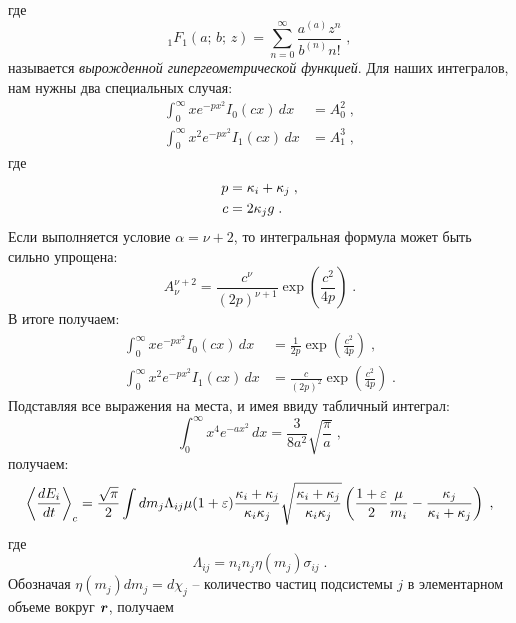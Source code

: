где 
\begin{equation}
  \mbox{}_{1}F_{1}(a;\,b;\,z) = \sum_{n=0}^{\infty}\frac{a^{(a)}z^n}{b^{(n)}n!}\;,
\end{equation}
называется \emph{вырожденной гипергеометрической функцией}. Для наших интегралов, нам нужны два специальных случая:
\begin{equation}
  \begin{split}
    \int_{0}^{\infty}xe^{-px^2}I_0(cx)\,dx &= A^{2}_{0}\;,\\
    \int_{0}^{\infty}x^2e^{-px^2}I_1(cx)\,dx &= A^{3}_{1}\;,
  \end{split}
\end{equation}
где
\begin{equation}
  \begin{split}
    p &= \kappa_i+\kappa_j\;,\\
    c &= 2\kappa_jg\;.
  \end{split}
\end{equation}
Если выполняется условие $\alpha=\nu+2$, то интегральная формула может быть сильно упрощена:
\begin{equation}
  A^{\nu+2}_{\nu} = \frac{c^{\nu}}{(2p)^{\nu+1}}\exp\left(\frac{c^2}{4p}\right)\;.
\end{equation}
В итоге получаем:
\begin{equation}
  \begin{split}
    \int_{0}^{\infty}xe^{-px^2}I_0(cx)\,dx &= \frac{1}{2p}\exp\left(\frac{c^2}{4p}\right)\;,\\
    \int_{0}^{\infty}x^2e^{-px^2}I_1(cx)\,dx &= \frac{c}{(2p)^2}\exp\left(\frac{c^2}{4p}\right)\;.
  \end{split}
\end{equation}
Подставляя все выражения на места, и имея ввиду табличный интеграл:
\begin{equation}      
    \int_{0}^{\infty}x^4e^{-ax^2}\,dx = \frac{3}{8a^2}\sqrt{\frac{\pi}{a}}\;,
\end{equation}
получаем:
\begin{equation}  
    \left\langle\frac{dE_i}{dt}\right\rangle_c = \frac{\sqrt{\pi}}{2}\int dm_j\Lambda_{ij}\mu(1+\varepsilon)
    \frac{\kappa_i+\kappa_j}{\kappa_i\kappa_j}\sqrt{\frac{\kappa_i+\kappa_j}{\kappa_i\kappa_j}}\left(\frac{1+\varepsilon}{2}\frac{\mu}{m_i}
    -\frac{\kappa_j}{\kappa_i+\kappa_j}\right)\;,
\end{equation}
где
\begin{equation}
  \Lambda_{ij} = n_in_j\eta(m_j)\sigma_{ij}\;.
\end{equation}
Обозначая $\eta(m_j)dm_j=d\chi_j$ -- количество частиц подсистемы $j$ в элементарном объеме вокруг $\bm{r}$, получаем
